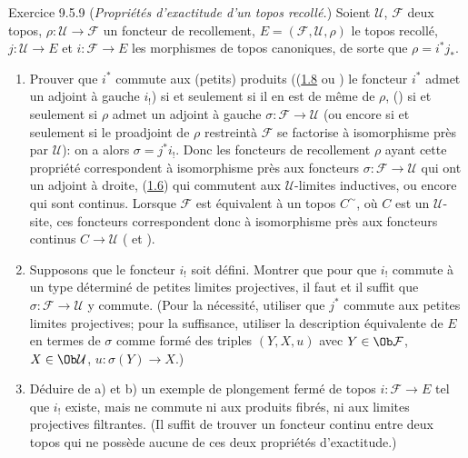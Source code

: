 \documentclass[10pt]{../fichiers-configuration-latex/smfart}
\begin{document}
\begin{enonce*}[remark]{Exercice 9.5.9}
(\emph{Propriétés d'exactitude d'un topos recollé.}) Soient
$\mathcal{U}$, $\mathcal{F}$ deux topos,
$\rho:\mathcal{U}\rightarrow \mathcal{F}$ un foncteur de
recollement, $E=(\mathcal{F}, \mathcal{U},\rho)$ le topos recollé,
$j:\mathcal{U}\rightarrow E$ et $i:\mathcal{F}\rightarrow E$ les
morphismes de topos canoniques, de sorte que
$\rho=i^{\ast}j_{\ast}$.
\begin{enumerate}
\renewcommand{\theenumi}{\alph{enumi}}
\renewcommand{\labelenumi}{\theenumi)}
\item Prouver que $i^{\ast}$ commute aux (petits) produits (\ie (\hyperref[IV.rem1.8]{1.8}
ou ) le foncteur $i^{\ast}$ admet un adjoint à gauche
$i_{!}$) si et seulement si il en est de même de $\rho$, \ie
(\loccit) si et seulement si $\rho$ admet un adjoint à gauche
$\sigma:\mathcal{F}\rightarrow \mathcal{U}$ (ou encore si et
seulement si le proadjoint de $\rho$ restreint\pageoriginale à
$\mathcal{F}$  se factorise à isomorphisme près par
$\mathcal{U}$): on a alors $\sigma=j^{\ast}i_{!}$. Donc les
foncteurs de recollement $\rho$ ayant cette propriété correspondent
à isomorphisme près aux foncteurs $\sigma:\mathcal{F}\rightarrow
\mathcal{U}$ qui ont un adjoint à droite, \ie (\hyperref[IV.cor1.6]{1.6}) qui
commutent aux $𝒰$-limites inductives, ou encore qui sont
continus. Lorsque $\mathcal{F}$ est équivalent à un topos
$C^{\sim}$, où $C$ est un $𝒰$-site, ces foncteurs
correspondent donc à isomorphisme près aux foncteurs continus
$C\rightarrow \mathcal{U}$ ( et ).

\item Supposons que le foncteur $i_{!}$ soit défini. Montrer que pour
que $i_{!}$ commute à un type déterminé de petites limites
projectives, il faut et il suffit que $\sigma:\mathcal{F}\rightarrow
\mathcal{U}$ y commute. (Pour la nécessité, utiliser que $j^{\ast}$
commute aux petites limites projectives; pour la suffisance,
utiliser la description équivalente de $E$ en termes de $\sigma$
comme formé des triples $(Y,X,u)$ avec $Y\in \Ob \mathcal{F}$, $X\in
\Ob \mathcal{U}$, $u:\sigma (Y)\rightarrow X$.)

\item Déduire de a) et b) un exemple de plongement fermé de topos
$i:\mathcal{F}\rightarrow E$ tel que $i_{!}$ existe, mais ne commute
ni aux produits fibrés, ni aux limites projectives filtrantes. (Il
suffit de trouver un foncteur continu entre deux topos qui ne
possède aucune de ces deux propriétés d'exactitude.)
\end{enumerate}
\end{enonce*}
\end{document}
